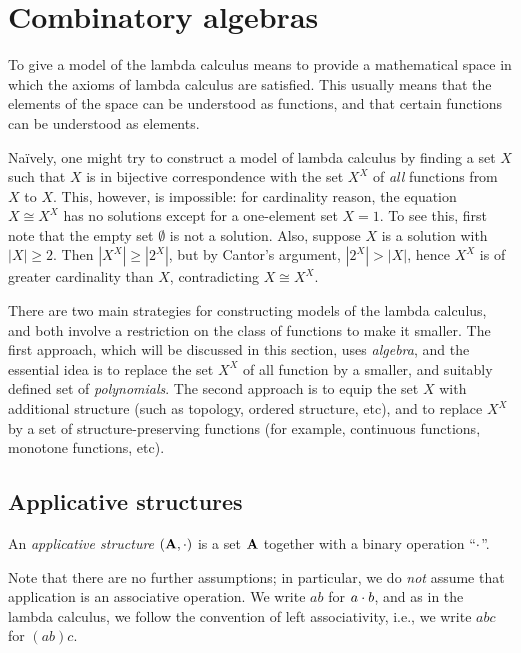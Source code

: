 \documentclass{article}
\begin{document}
\section{Combinatory algebras}

To give a model of the lambda calculus means to provide a mathematical
space in which the axioms of lambda calculus are satisfied. This
usually means that the elements of the space can be understood as
functions, and that certain functions can be understood as elements. 

Na\"ively, one might try to construct a model of lambda calculus by
finding a set $X$ such that $X$ is in bijective correspondence with
the set $X^X$ of {\em all} functions from $X$ to $X$. This, however,
is impossible: for cardinality reason, the equation $X\cong X^X$ has
no solutions except for a one-element set $X=1$. To see this, first
note that the empty set $\emptyset$ is not a solution. Also, suppose
$X$ is a solution with $|X|\geq 2$. Then $|X^X|\geq |2^X|$, but by
Cantor's argument, $|2^X|>|X|$, hence $X^X$ is of greater cardinality
than $X$, contradicting $X\cong X^X$.

There are two main strategies for constructing models of the lambda
calculus, and both involve a restriction on the class of functions to
make it smaller. The first approach, which will be discussed in this
section, uses {\em algebra}, and the essential idea is to replace the
set $X^X$ of all function by a smaller, and suitably defined set of
{\em polynomials}. The second approach is to equip the set $X$ with
additional structure (such as topology, ordered structure, etc), and
to replace $X^X$ by a set of structure-preserving functions (for
example, continuous functions, monotone functions, etc).

\subsection{Applicative structures}

\begin{definition}
  An {\em applicative structure} $({\bf A},\cdot)$ is a set ${\bf A}$ together
  with a binary operation ``$\cdot$''.
\end{definition}

Note that there are no further assumptions; in particular, we do {\em
  not} assume that application is an associative operation. We write
$ab$ for $a\cdot b$, and as in the lambda calculus, we follow the
convention of left associativity, i.e., we write $abc$ for $(ab)c$.
\end{document}
